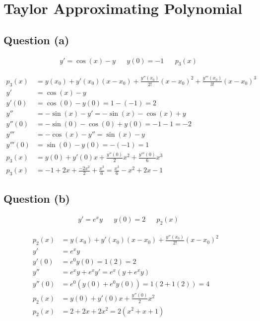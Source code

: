 \section{Taylor Approximating Polynomial}
	\subsection{Question (a)}
		\begin{align}
			&y' = \cos{(x)}-y&
			&y(0) = -1&
			&p_{3}(x)&
		\end{align}

		\begin{align}
			p_{3}(x) &= y(x_{0}) + y'(x_{0})(x-x_{0}) + \frac{y''(x_{0})}{2!}(x - x_{0})^{2} + \frac{y'''(x_{0})}{3!}(x - x_{0})^{3}& \\
			y' &= \cos{(x)}-y& \\
			y'(0) &= \cos{(0)} - y(0) = 1 - (-1) = 2& \\
			y'' &= -\sin{(x)} - y' = -\sin{(x)} - \cos{(x)} + y& \\
			y''(0) &= -\sin{(0)} - \cos{(0)} + y(0) = -1 -1 = -2 & \\
			y''' &= -\cos{(x)} - y'' = \sin{(x)} - y& \\
			y'''(0) &= \sin{(0)} - y(0) = -(-1) = 1& \\
			p_{3}(x) &= y(0) + y'(0)x + \frac{y''(0)}{2}x^{2} + \frac{y'''(0)}{6}x^{3}& \\
			p_{3}(x) &= -1 + 2x + \frac{-2x^{2}}{2} + \frac{x^{3}}{6} = \frac{x^{3}}{6} - x^{2} + 2x - 1&
		\end{align}

	\subsection{Question (b)}
		\begin{align}
			&y' = e^{x}y&
			&y(0) = 2&
			&p_{2}(x)&
		\end{align}

		\begin{align}
			p_{2}(x) &= y(x_{0}) + y'(x_{0})(x-x_{0}) + \frac{y''(x_{0})}{2!}(x-x_{0})^{2}& \\
			y' &= e^{x}y& \\
			y'(0) &= e^{0}y(0) = 1(2) = 2& \\
			y'' &= e^{x}y + e^{x}y' = e^{x}(y + e^{x}y)& \\
			y''(0) &= e^{0}(y(0) + e^{0}y(0)) = 1(2 + 1(2)) = 4& \\
			p_{2}(x) &= y(0) + y'(0)x + \frac{y''(0)}{2}x^{2}& \\
			p_{2}(x) &= 2 + 2x + 2x^{2} = 2(x^{2} + x + 1)&
		\end{align}
